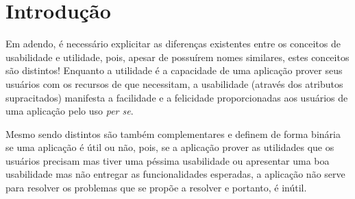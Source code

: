 \section{Introdução}
Em adendo, é necessário explicitar as diferenças existentes entre os conceitos de usabilidade e utilidade, pois, apesar de possuírem nomes similares, estes conceitos são distintos! Enquanto a utilidade é a capacidade de uma aplicação prover seus usuários com os recursos de que necessitam, a usabilidade (através dos atributos supracitados) manifesta a facilidade e a felicidade proporcionadas aos usuários de uma aplicação pelo uso \textit{per se}. 

Mesmo sendo distintos são também complementares e definem de forma binária se uma aplicação é útil ou não, pois, se a aplicação prover as utilidades que os usuários precisam mas tiver uma péssima usabilidade ou apresentar uma boa usabilidade mas não entregar as funcionalidades esperadas, a aplicação não serve para resolver os problemas que se propõe a resolver e portanto, é inútil. 
